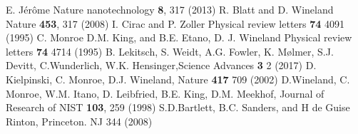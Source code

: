 \documentclass[aps,prb,twocolumn,superscriptaddress]{revtex4-1}
\begin{document}
	
\begin{thebibliography}{100}
	
     E. J{\'e}r{\^o}me Nature nanotechnology \textbf{8}, 317 (2013)
	 R. Blatt and D. Wineland Nature \textbf{453}, 317 (2008)
	 I. Cirac and P. Zoller Physical review letters \textbf{74} 4091 (1995)
	 C. Monroe D.M. King, and B.E. Etano, D. J. Wineland Physical review letters \textbf{74} 4714 (1995)
	 B. Lekitsch, S. Weidt, A.G. Fowler, K. M{\o}lmer, S.J. Devitt, C.Wunderlich, W.K. Hensinger,Science Advances \textbf{3} 2 (2017)
	 D. Kielpinski, C. Monroe, D.J. Wineland, Nature \textbf{417} 709 (2002)
	 D.Wineland, C. Monroe, W.M. Itano, D. Leibfried, B.E. King, D.M. Meekhof, Journal of Research of NIST \textbf{103}, 259 (1998)
	 S.D.Bartlett, B.C. Sanders, and H de Guise Rinton, Princeton. NJ 344 (2008)
	
	
\end{thebibliography}
\end{document}
